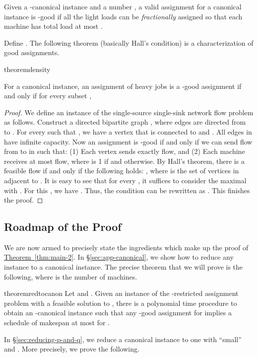 \documentclass[11pt]{article}
\newenvironment{definition}{\begin{Definition}}{\end{Definition}}
\newtheorem{definition}[lemma]{Definition}
\newcommand{\Sec}[1]{\texorpdfstring{\hyperref[sec:#1]{\S\ref*{sec:#1}}}{\S\ref*{sec:#1}}} \newcommand{\Eqn}[1]{\texorpdfstring{\hyperref[eq:#1]{(\ref*{eq:#1})}}{(\ref*{eq:#1})}} \newcommand{\Thm}[1]{\texorpdfstring{\hyperref[thm:#1]{Theorem~\ref*{thm:#1}}}{Theorem~\ref*{thm:#1}}} \newcommand{\Lem}[1]{\texorpdfstring{\hyperref[lem:#1]{Lemma~\ref*{lem:#1}}}{Lemma~\ref*{lem:#1}}} \newcommand{\Def}[1]{\texorpdfstring{\hyperref[def:#1]{Definition~\ref*{def:#1}}}{Definition~\ref*{def:#1}}} \newcommand{\Clm}[1]{\texorpdfstring{\hyperref[clm:#1]{Claim~\ref*{clm:#1}}}{Claim~\ref*{clm:#1}}} \newcommand{\App}[1]{\hyperref[app:#1]{Appendix~\ref*{app:#1}}}
\begin{document}
\begin{definition}[-good Assignment]
Given a -canonical instance and a number ,  a valid assignment  for a canonical instance is -good if all the light loads can be \emph{fractionally} assigned so that each machine has total load at most .
\end{definition}
\noindent
Define . The following theorem (basically Hall's condition)
is a characterization of good assignments. 

\begin{restatable}{theorem}{density}
\label{thm:alpha-good-equivalent-to-no-bad-set}

For a canonical instance, an assignment  of heavy jobs is a -good assignment if and only if for every subset ,

\end{restatable}

\begin{proof}
We define an instance of the single-source single-sink network flow problem as follows.  Construct a directed bipartite graph , where edges are directed from  to . For every  such that , we have a vertex  that is connected to  and . All edges in  have infinite capacity.  Now an assignment  is -good if and only if we can send flow from  to  in  such that: (1) Each vertex  sends exactly  flow, and (2)
Each machine  receives at most  flow, where  is 1 if  and  otherwise.
By Hall's theorem, there is a feasible flow if and only if the following holds:
,
where  is the set of vertices in  adjacent to .  It is easy to see that for every , it suffices to consider the maximal  with . For this , we have . Thus, the condition can be rewritten as 
.
This finishes the proof.
\end{proof}

\subsection{Roadmap of the Proof}

We are now armed to precisely state the ingredients which make up the proof of \Thm{main-2}. 
In \Sec{app-canonical}, we show how to reduce any instance to a canonical instance.  
The precise theorem that we will prove is the following, where  is the number of machines. 

\begin{restatable}{theorem}{redtocanon}
\label{thm:reducing-to-canonical-instances}\label{thm:1}
Let  and . Given an instance  of the -restricted assignment problem with a feasible solution to , there is a polynomial time procedure to obtain an -canonical instance  such that any -good assignment for  implies a schedule of makespan at most  for .
\end{restatable}
\noindent
In \Sec{reducing-p-and-q}, we reduce a canonical instance to one with ``small''  and . More precisely, we prove the following.
\end{document}
